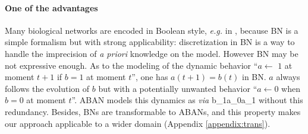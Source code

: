 \paragraph{\textbf{One of the advantages}}
Many biological networks are encoded in Boolean style, \textit{e.g.} in \cite{akutsu2007control,kauffman1969}, because BN is a simple formalism but with strong applicability: discretization in BN is a way to handle the imprecision of \textit{a priori} knowledge on the model.
However BN may be not expressive enough.
As to the modeling of the dynamic behavior ``$a\gets$ $1$ at moment $t+1$ if $b=1$ at moment $t$'', one has $a(t+1)=b(t)$ in BN.
$a$ always follows the evolution of $b$ but with a potentially unwanted behavior ``$a\gets 0$ when $b=0$ at moment $t$''.
ABAN models this dynamics as \textit{via} \ac{b_1}{a_0}{a_1} without this redundancy. 
Besides, BNs are transformable to ABANs, and this property makes our approach applicable to a wider domain (Appendix \ref{appendix:trans}).

